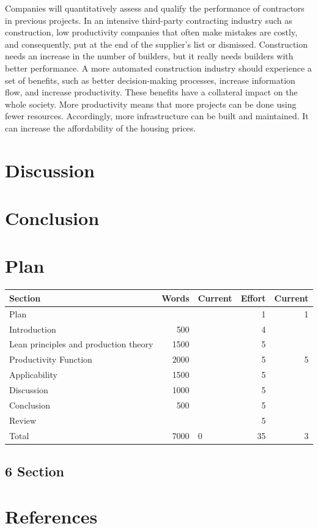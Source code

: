 \documentclass{article}
\begin{document}
Companies will quantitatively assess and qualify the performance of contractors in previous projects.
In an intensive third-party contracting industry such as construction, low productivity companies that often make mistakes are costly, and consequently, put at the end of the supplier's list or dismissed.
Construction needs an increase in the number of builders, but it really needs builders with better performance.
A more automated construction industry should experience a set of benefits, such as
better decision-making processes, increase information flow, and increase productivity.
These benefits have a collateral impact on the whole society.
More productivity means that more projects can be done using fewer resources.
Accordingly, more infrastructure can be built and maintained.
It can increase the affordability of the housing prices.

\section{Discussion}
\label{sec:org074223c}
\section{Conclusion}
\label{sec:orga1f31dc}

\section{Plan}
\label{sec:orgfb43391}
\begin{center}
\begin{tabular}{lrlrr}
Section & Words & Current & Effort & Current\\
\hline
Plan &  &  & 1 & 1\\
Introduction & 500 &  & 4 & \\
Lean principles and production theory & 1500 &  & 5 & \\
Productivity Function & 2000 &  & 5 & 5\\
Applicability & 1500 &  & 5 & \\
Discussion & 1000 &  & 5 & \\
Conclusion & 500 &  & 5 & \\
Review &  &  & 5 & \\
\hline
Total & 7000 & 0 & 35 & 3\\
\end{tabular}
\end{center}
\subsection{6 Section}
\label{sec:org3e41ad7}

\section{References}
\label{sec:org3f6507d}

\printbibliography[title=none]
\end{document}
